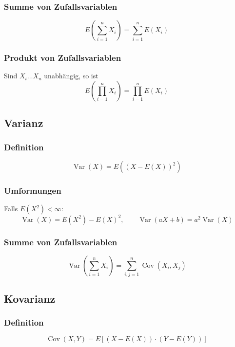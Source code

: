 \documentclass[a4paper,titlepage]{article}
\DeclareMathOperator{\Var}{Var}
\DeclareMathOperator{\Cov}{Cov}
\begin{document}
\subsubsection{Summe von Zufallsvariablen}
\begin{equation*}
E\left( \sum_{i=1}^n X_i \right) = \sum_{i=1}^n E \left( X_i \right)
\end{equation*}
\subsubsection{Produkt von Zufallsvariablen}
Sind $X_i \dots X_n$ unabhängig, so ist 
\begin{equation*}
E \left( \prod_{i=1}^n X_i \right) = \prod_{i=1}^n E\left(X_i\right)
\end{equation*}

\subsection{Varianz}
\subsubsection{Definition}
\begin{equation*}
\Var(X) = E\left( \left(X-E(X) \right)^2 \right)
\end{equation*}
\subsubsection{Umformungen}
Falls $E(X^2) < \infty$:
\begin{equation*}
\Var(X) = E(X^2) - E(X)^2, \qquad \Var(aX + b) = a^2 \Var(X)
\end{equation*}
\subsubsection{Summe von Zufallsvariablen}
\begin{equation*}
\Var\left( \sum_{i=1}^n X_i \right) = \sum_{i,j=1}^n \Cov(X_i,X_j) 
\end{equation*}

\subsection{Kovarianz}
\subsubsection{Definition}
\begin{equation*}
\Cov(X,Y) = E\left[ \left( X- E \left( X \right) \right) \cdot \left( Y - E\left( Y \right)\right) \right]
\end{equation*}
\end{document}

